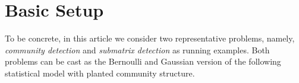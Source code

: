 	


 \section{Basic Setup}


%
%
%
%


To be concrete, in this article we consider two representative problems, namely, \emph{community detection}  and \emph{submatrix detection}
as running examples. 
Both problems can be cast as the Bernoulli and Gaussian version of the following statistical model with planted community structure. 



 



	
